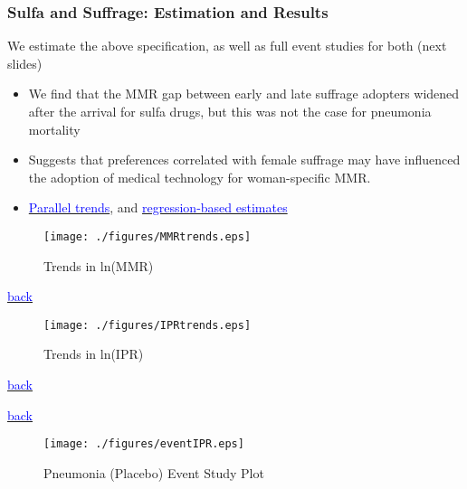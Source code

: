 \documentclass[10pt,letterpaper,subeqn]{beamer}
\begin{document}
\begin{frame}[label=USA]
\frametitle{Sulfa and Suffrage: Estimation and Results}
We estimate the above specification, as well as full event studies for both 
(next slides)
\vspace{5mm}
\begin{itemize}
\setlength{\itemsep}{15pt}
  \item We find that the MMR gap between early and late suffrage adopters widened 
        after the arrival for sulfa drugs, but this was not the case for 
        pneumonia mortality
  \item Suggests that preferences correlated with female suffrage may have 
        influenced the adoption of medical technology for woman-specific MMR.
  \item \hyperlink{ptrends}{\textcolor{blue}{Parallel trends}}, and 
        \hyperlink{DDreg}{\textcolor{blue}{regression-based estimates}}
\end{itemize}
\end{frame}

\begin{frame}[plain,label=ptrends]
\begin{figure}[h!]
\centering
\caption{Trends in ln(MMR)}
\texttt{[image: ./figures/MMRtrends.eps]}
\end{figure}
{\footnotesize \hyperlink{USA}{\textcolor{blue}{back}}}
\end{frame}

\begin{frame}[plain,label=ptrends]
\begin{figure}[h!]
\centering
\caption{Trends in ln(IPR)}
\texttt{[image: ./figures/IPRtrends.eps]}
\end{figure}
{\footnotesize \hyperlink{USA}{\textcolor{blue}{back}}}
\end{frame}

\begin{frame}[plain,label=DDreg]

{\footnotesize \hyperlink{USA}{\textcolor{blue}{back}}}
\end{frame}


\begin{frame}[label=IPREvent,plain]
\begin{figure}
\caption{Pneumonia (Placebo) Event Study Plot}
\texttt{[image: ./figures/eventIPR.eps]}
\end{figure}
\end{frame}
\end{document}
